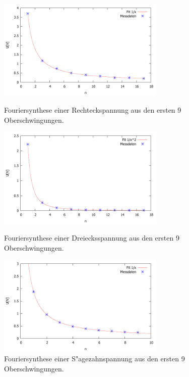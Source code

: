 \begin{figure}[!h]
	\centering
	\includegraphics[width = 8cm]{img/rechteck.pdf}
	\caption{Fouriersynthese einer Rechteckspannung aus den ersten 9 Oberschwingungen.}
	\label{fg:recht}

	\includegraphics[width = 8cm]{img/dreieck.pdf}
	\caption{Fouriersynthese einer Dreiecksspannung aus den ersten 9 Oberschwingungen.}
	\label{fg:dreieck}

	\includegraphics[width = 8cm]{img/saegezahn.pdf}
	\caption{Fouriersynthese einer S"agezahnspannung aus den ersten 9 Oberschwingungen.}
	\label{fg:recht}
\end{figure}